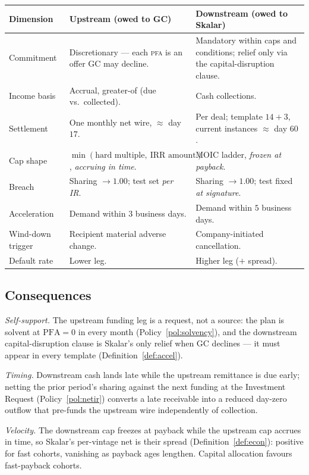 \documentclass[11pt, a4paper]{article}
\theoremstyle{definition}
\newcommand{\PFA}{\mathrm{PFA}}                   %
\begin{document}
\begin{center}
\begin{tabular}{@{} L{2.8cm} L{5.2cm} L{5.2cm} @{}}
\toprule
\textbf{Dimension} & \textbf{Upstream (owed to GC)} & \textbf{Downstream (owed to Skalar)} \\
\midrule
Commitment & Discretionary --- each \textsc{pfa} is an offer GC may decline. & Mandatory within caps and conditions; relief only via the capital-disruption clause. \\[3pt]
Income basis & Accrual, greater-of (due vs.\ collected). & Cash collections. \\[3pt]
Settlement & One monthly net wire, $\approx$ day $17$. & Per deal; template $14+3$, current instances $\approx$ day $60$. \\[3pt]
Cap shape & $\min(\text{hard multiple},\ \text{IRR amount})$, \emph{accruing in time}. & MOIC ladder, \emph{frozen at payback}. \\[3pt]
Breach & Sharing $\to 1.00$; test set \emph{per IR}. & Sharing $\to 1.00$; test fixed \emph{at signature}. \\[3pt]
Acceleration & Demand within $3$ business days. & Demand within $5$ business days. \\[3pt]
Wind-down trigger & Recipient material adverse change. & Company-initiated cancellation. \\[3pt]
Default rate & Lower leg. & Higher leg ($+$ spread). \\
\bottomrule
\end{tabular}
\end{center}

\subsection{Consequences}

\emph{Self-support.} The upstream funding leg is a request, not a source: the plan is solvent at $\PFA = 0$ in every month (Policy~\ref{pol:solvency}), and the downstream capital-disruption clause is Skalar's only relief when GC declines --- it must appear in every template (Definition~\ref{def:accel}).

\emph{Timing.} Downstream cash lands late while the upstream remittance is due early; netting the prior period's sharing against the next funding at the Investment Request (Policy~\ref{pol:netir}) converts a late receivable into a reduced day-zero outflow that pre-funds the upstream wire independently of collection.

\emph{Velocity.} The downstream cap freezes at payback while the upstream cap accrues in time, so Skalar's per-vintage net is their spread (Definition~\ref{def:econ}): positive for fast cohorts, vanishing as payback ages lengthen. Capital allocation favours fast-payback cohorts.
\end{document}
